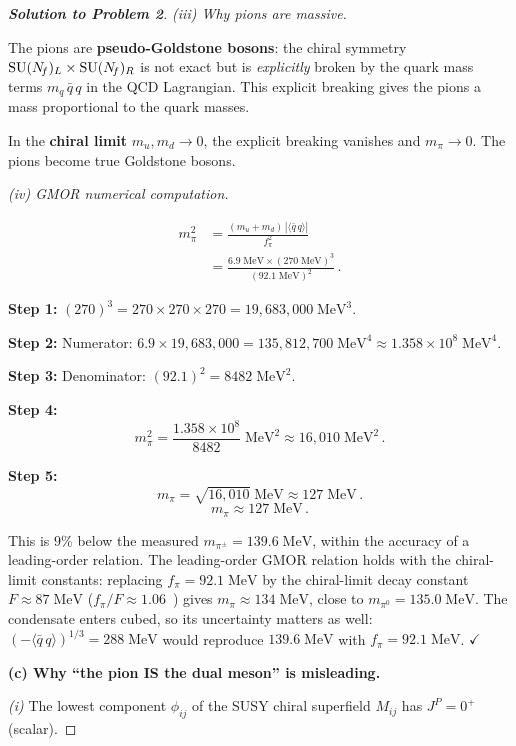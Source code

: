 \documentclass[11pt,a4paper]{article}
\newcommand{\fpi}{f_\pi}
\newcommand{\qqbar}{\langle \bar{q}\,q \rangle}
\begin{document}
\begin{proof}[\textbf{Solution to Problem 2}]
\textit{(iii) Why pions are massive.}

The pions are \textbf{pseudo-Goldstone bosons}: the chiral symmetry
$\mathrm{SU}(N_{\!f})_L \times \mathrm{SU}(N_{\!f})_R$ is not exact but is \emph{explicitly}
broken by the quark mass terms $m_q\,\bar{q}\,q$ in the QCD
Lagrangian.  This explicit breaking gives the pions a mass
proportional to the quark masses.

In the \textbf{chiral limit} $m_u, m_d \to 0$, the explicit breaking
vanishes and $m_\pi \to 0$.  The pions become true Goldstone bosons.

\textit{(iv) GMOR numerical computation.}

\begin{align*}
  m_\pi^2
  &= \frac{(m_u + m_d)\,|\qqbar|}{\fpi^2} \\
  &= \frac{6.9\;\text{MeV} \times (270\;\text{MeV})^3}
    {(92.1\;\text{MeV})^2}\,.
\end{align*}

\textbf{Step 1:} $(270)^3 = 270 \times 270 \times 270 = 19{,}683{,}000\;\text{MeV}^3$.

\textbf{Step 2:} Numerator: $6.9 \times 19{,}683{,}000
= 135{,}812{,}700\;\text{MeV}^4 \approx 1.358 \times 10^8\;\text{MeV}^4$.

\textbf{Step 3:} Denominator: $(92.1)^2 = 8482\;\text{MeV}^2$.

\textbf{Step 4:}
\[
  m_\pi^2 = \frac{1.358 \times 10^8}{8482}\;\text{MeV}^2
  \approx 16{,}010\;\text{MeV}^2\,.
\]

\textbf{Step 5:}
\[
  m_\pi = \sqrt{16{,}010}\;\text{MeV}
  \approx 127\;\text{MeV}\,.
\]
\[
  \boxed{m_\pi \approx 127\;\text{MeV}\,.}
\]

This is $9\%$ below the measured $m_{\pi^\pm} = 139.6\;\text{MeV}$,
within the accuracy of a leading-order relation.  The leading-order
GMOR relation holds with the chiral-limit constants: replacing
$\fpi = 92.1\;\text{MeV}$ by the chiral-limit decay constant
$F \approx 87\;\text{MeV}$ ($\fpi/F \approx 1.06$~\cite{FLAG2024})
gives $m_\pi \approx 134\;\text{MeV}$, close to
$m_{\pi^0} = 135.0\;\text{MeV}$.  The condensate enters cubed, so its
uncertainty matters as well: $(-\qqbar)^{1/3} = 288\;\text{MeV}$ would
reproduce $139.6\;\text{MeV}$ with $\fpi = 92.1\;\text{MeV}$.
\quad$\checkmark$

\bigskip

\textbf{(c) Why ``the pion IS the dual meson'' is misleading.}

\textit{(i)} The lowest component $\phi_{ij}$ of the SUSY chiral
superfield $M_{ij}$ has $J^P = 0^+$ (scalar).


\end{proof}
\end{document}
